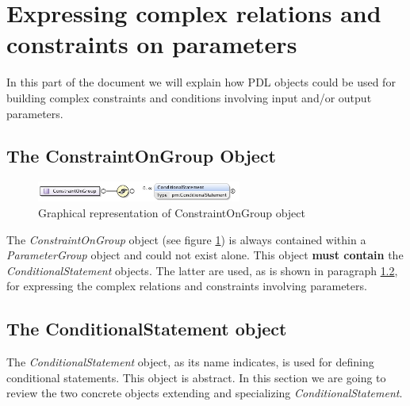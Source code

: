 \documentclass[a4paper,11pt] {ivoa}
\begin{document}
\section{Expressing complex relations and constraints on parameters} 
In this part of the document we will explain how PDL objects could be used for building complex
constraints and conditions involving input and/or output parameters.

\subsection{The ConstraintOnGroup Object}\label{par-ConstraintsOnGroup}
\begin{figure}[htbp]
\begin{center}
\includegraphics[width=0.6\textwidth]{pictures/ConstraintOnGroup.jpg} 
\caption{Graphical representation of ConstraintOnGroup object}
\label{Pic-ConstraintOnGroup}
\end{center}
\end{figure}

The {\it  ConstraintOnGroup} object (see figure \ref{Pic-ConstraintOnGroup}) is always contained within a {\it ParameterGroup} object and could not exist alone.
This object {\bf must contain} the {\it ConditionalStatement} objects. The latter are used, as is
shown in paragraph \ref{par-ConditionalStatement}, for expressing the complex relations and
constraints involving parameters.

\subsection{The ConditionalStatement object}\label{par-ConditionalStatement}
The {\it ConditionalStatement} object, as its name indicates, is used for defining conditional
statements. This object is abstract. In this section we are going to review the two concrete objects
extending and specializing  {\it ConditionalStatement}.
\end{document}
